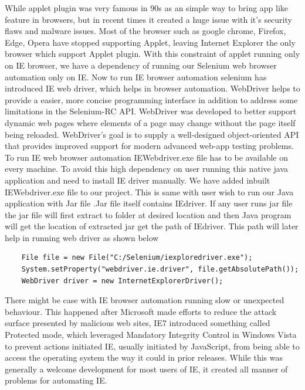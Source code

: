 \documentclass[article,type=msc,colorback,accentcolor=tud9c,twoside,11pt]{tudthesis}
\begin{document}
	While applet plugin was very famous in 90s as an simple way to bring app like feature in browsers, but in recent times it created a huge issue with it's security flaws and malware issues. Most of the browser such as google chrome, Firefox, Edge, Opera have stopped supporting Applet, leaving Internet Explorer the only browser which support Applet plugin.
	With this constraint of applet running only on IE browser, we have a dependency of running our Selenium web browser automation only on IE. Now to run IE browser automation selenium has introduced IE web driver, which helps in browser automation. WebDriver helps to provide a easier, more concise programming interface in addition to address some limitations in the Selenium-RC API. WebDriver was developed to better support dynamic web pages where elements of a page may change without the page itself being reloaded. WebDriver's goal is to supply a well-designed object-oriented API that provides improved support for modern advanced web-app testing problems. To run IE web browser automation IEWebdriver.exe file has to be available on every machine. To avoid this high dependency on user running this native java application and need to install IE driver manually. We have added inbuilt IEWebdriver.exe file to our project. This is same with user wish to run our Java application with Jar file .Jar file itself contains IEdriver. If any user runs jar file the jar file will first extract to folder at desired location and then Java program will get the location of extracted jar get the path of IEdriver. This path will later help in running web driver as shown below
	\begin{lstlisting}
	File file = new File("C:/Selenium/iexploredriver.exe");
	System.setProperty("webdriver.ie.driver", file.getAbsolutePath());
	WebDriver driver = new InternetExplorerDriver();
	\end{lstlisting}
	There might be case with IE browser automation running slow or unexpected behaviour. This happened after Microsoft made efforts to reduce the attack surface presented by malicious web sites, IE7 introduced something called Protected mode, which leveraged Mandatory Integrity Control in Windows Vista to prevent actions initiated IE, usually initiated by JavaScript, from being able to access the operating system the way it could in prior releases. While this was generally a welcome development for most users of IE, it created all manner of problems for automating IE.
	
\end{document}
